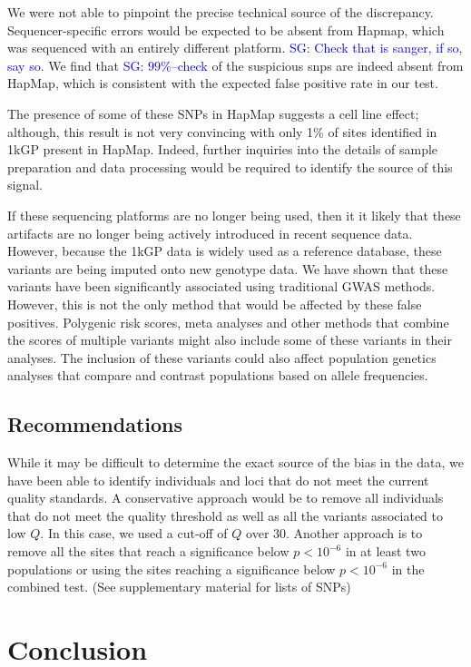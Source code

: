 \documentclass[9pt,lineno]{elife}
\newcommand{\sgcomment}[1]{\textcolor{blue}{SG: #1}}
\begin{document}
We were not able to pinpoint the precise technical source of the discrepancy. Sequencer-specific errors would be expected to be absent from Hapmap, which was sequenced with an entirely different platform. \sgcomment{Check that is sanger, if so, say so}. We find that \sgcomment{$99\%$--check} of the suspicious snps are indeed absent from HapMap, which is consistent with the expected false positive rate in our test.   
  
The presence of some of these SNPs in HapMap suggests a cell line effect; although, this result is not very convincing with only 1\% of sites identified in 1kGP present in HapMap.
Indeed, further inquiries into the details of sample preparation and data processing would be required to identify the source of this signal. 

If these sequencing platforms are no longer being used, then it it likely that these artifacts are no longer being actively introduced in recent sequence data.
However, because the 1kGP data is widely used as a reference database, these variants are being imputed onto new genotype data.
We have shown that these variants have been significantly associated using traditional GWAS methods.
However, this is not the only method that would be affected by these false positives. 
Polygenic risk scores, meta analyses and other methods that combine the scores of multiple variants might also include some of these variants in their analyses.
The inclusion of these variants could also affect population genetics analyses that compare and contrast populations based on allele frequencies.


\subsection{Recommendations}
While it may be difficult to determine the exact source of the bias in the data, we have been able to identify individuals and loci that do not meet the current quality standards.
A conservative approach would be to remove all individuals that do not meet the quality threshold as well as all the variants associated to low $Q$.
In this case, we used a cut-off of $Q$ over 30.
Another approach is to remove all the sites that reach a significance below $ p < 10^{-6}$ in at least two populations or using the sites reaching a significance below $ p < 10^{-6}$ in the combined test. (See supplementary material for lists of SNPs)

\section{Conclusion}
\end{document}
